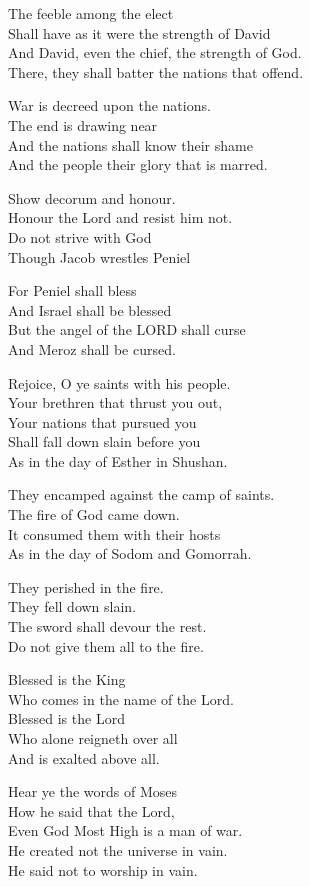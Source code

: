 \documentclass[
]{book}
\begin{document}
The feeble among the elect\\
Shall have as it were the strength of David\\
And David, even the chief, the strength of God.\\
There, they shall batter the nations that offend.

War is decreed upon the nations.\\
The end is drawing near\\
And the nations shall know their shame\\
And the people their glory that is marred.

Show decorum and honour.\\
Honour the Lord and resist him not.\\
Do not strive with God\\
Though Jacob wrestles Peniel

For Peniel shall bless\\
And Israel shall be blessed\\
But the angel of the LORD shall curse\\
And Meroz shall be cursed.

Rejoice, O ye saints with his people.\\
Your brethren that thrust you out,\\
Your nations that pursued you\\
Shall fall down slain before you\\
As in the day of Esther in Shushan.

They encamped against the camp of saints.\\
The fire of God came down.\\
It consumed them with their hosts\\
As in the day of Sodom and Gomorrah.

They perished in the fire.\\
They fell down slain.\\
The sword shall devour the rest.\\
Do not give them all to the fire.

Blessed is the King\\
Who comes in the name of the Lord.\\
Blessed is the Lord\\
Who alone reigneth over all\\
And is exalted above all.

Hear ye the words of Moses\\
How he said that the Lord,\\
Even God Most High is a man of war.\\
He created not the universe in vain.\\
He said not to worship in vain.
\end{document}
